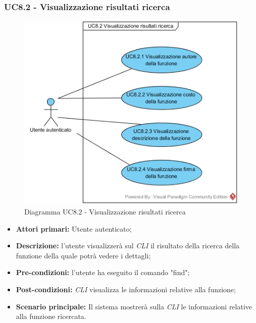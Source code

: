 \subsubsection{UC8.2 - Visualizzazione risultati ricerca}
\begin{figure}[h]
	\centering
	\includegraphics[width=0.7\linewidth]{res/img/UC8.2.jpg}
	\caption{Diagramma UC8.2 - Visualizzazione risultati ricerca}
\end{figure}
\begin{itemize}
	\item \textbf{Attori primari:} Utente autenticato;
	\item \textbf{Descrizione:} l'utente visualizzerà sul \textit{CLI\glo} il risultato della ricerca della funzione della quale potrà vedere i dettagli;
	\item \textbf{Pre-condizioni:} l'utente ha eseguito il comando "find";
	\item \textbf{Post-condizioni:} \textit{CLI\glo} visualizza le informazioni relative alla funzione;
	\item \textbf{Scenario principale:} Il sistema mostrerà sulla \textit{CLI\glo} le informazioni relative alla funzione ricercata.
\end{itemize}
